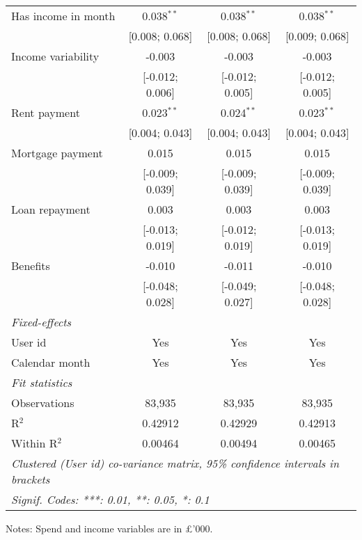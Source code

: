 \begin{table}[htbp]
\begin{threeparttable}[b]
\begin{tabular}{lccc}
         Has income in month       & 0.038$^{**}$    & 0.038$^{**}$    & 0.038$^{**}$\\   
                                   & [0.008; 0.068]  & [0.008; 0.068]  & [0.009; 0.068]\\   
         Income variability        & -0.003          & -0.003          & -0.003\\   
                                   & [-0.012; 0.006] & [-0.012; 0.005] & [-0.012; 0.005]\\   
         Rent payment              & 0.023$^{**}$    & 0.024$^{**}$    & 0.023$^{**}$\\   
                                   & [0.004; 0.043]  & [0.004; 0.043]  & [0.004; 0.043]\\   
         Mortgage payment          & 0.015           & 0.015           & 0.015\\   
                                   & [-0.009; 0.039] & [-0.009; 0.039] & [-0.009; 0.039]\\   
         Loan repayment            & 0.003           & 0.003           & 0.003\\   
                                   & [-0.013; 0.019] & [-0.012; 0.019] & [-0.013; 0.019]\\   
         Benefits                  & -0.010          & -0.011          & -0.010\\   
                                   & [-0.048; 0.028] & [-0.049; 0.027] & [-0.048; 0.028]\\   
         \midrule
         \emph{Fixed-effects}\\
         User id                   & Yes             & Yes             & Yes\\  
         Calendar month            & Yes             & Yes             & Yes\\  
         \midrule
         \emph{Fit statistics}\\
         Observations              & 83,935          & 83,935          & 83,935\\  
         R$^2$                     & 0.42912         & 0.42929         & 0.42913\\  
         Within R$^2$              & 0.00464         & 0.00494         & 0.00465\\  
         \midrule \midrule
         \multicolumn{4}{l}{\emph{Clustered (User id) co-variance matrix, 95\% confidence intervals in brackets}}\\
         \multicolumn{4}{l}{\emph{Signif. Codes: ***: 0.01, **: 0.05, *: 0.1}}\\
      \end{tabular}
      
      \begin{tablenotes}\footnotesize
         \item Notes: Spend and income variables are in \pounds'000.
      \end{tablenotes}
   \end{threeparttable}
\end{table}



